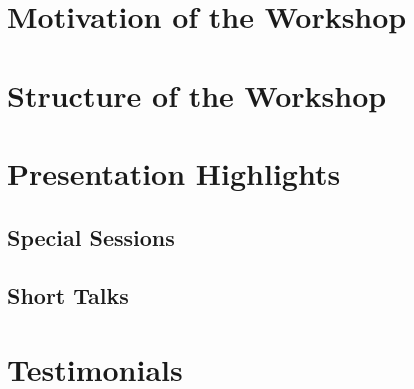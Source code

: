 \tableofcontents

\section{Motivation of the Workshop}



\section{Structure of the Workshop}



\section{Presentation Highlights}

\subsection{Special Sessions}





\subsection{Short Talks}
\label{sec:short-talks}














\section{Testimonials}






